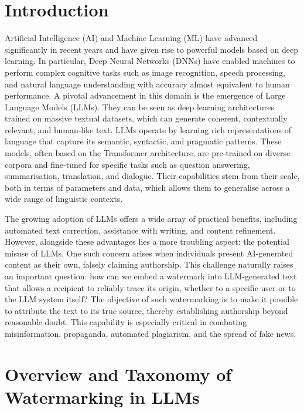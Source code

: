 \documentclass[a4paper,11pt]{llncs}
\begin{document}
\section{Introduction}
\label{sec:introduction}
Artificial Intelligence (AI) and Machine Learning (ML) have advanced significantly in recent years and
have given rise to powerful models based on deep learning. In particular, Deep Neural Networks (DNNs) have enabled machines to perform complex cognitive tasks such as image recognition, speech processing, and natural language understanding with accuracy almost equivalent to human performance. A pivotal advancement in this domain is the emergence of Large Language Models (LLMs). They can be seen as deep learning architectures trained on massive textual datasets, which can generate coherent, contextually relevant, and human-like text. LLMs operate by learning rich representations of language that capture its semantic, syntactic, and pragmatic patterns. These models, often based on the Transformer architecture, are pre-trained on diverse corpora and fine-tuned for specific tasks such as question answering, summarisation, translation, and dialogue. Their capabilities stem from their scale, both in terms of parameters and data, which allows them to generalise across a wide range of linguistic contexts.

The growing adoption of LLMs offers a wide array of practical benefits, including automated text correction, assistance with writing, and content refinement. However, alongside these advantages lies a more troubling aspect: the potential misuse of LLMs. One such concern arises when individuals present AI-generated content as their own, falsely claiming authorship. This challenge naturally raises an important question: how can we embed a watermark into LLM-generated text that allows a recipient to reliably trace its origin, whether to a specific user or to the LLM system itself?
The objective of such watermarking is to make it possible to attribute the text to its true source, thereby establishing authorship beyond reasonable doubt. This capability is especially critical in combating misinformation, propaganda, automated plagiarism, and the spread of fake news. 


\section{Overview and Taxonomy of Watermarking in LLMs}
\end{document}
